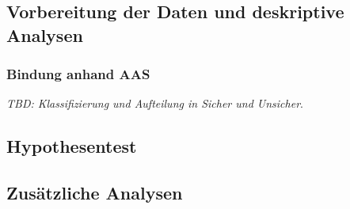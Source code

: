 \subsection{Vorbereitung der Daten und deskriptive Analysen}
\subsubsection{Bindung anhand AAS}
\textit{TBD: Klassifizierung und Aufteilung in Sicher und Unsicher}.

\subsection{Hypothesentest} \label{sec:Hypothesentest}

\subsection{Zusätzliche Analysen} \label{sec:ZusätzlicheAnalysen}